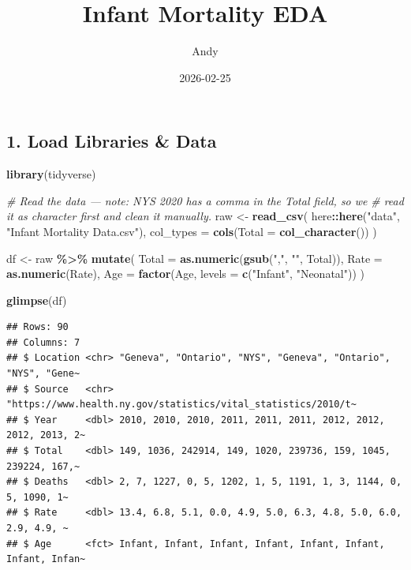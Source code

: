 \documentclass[
]{article}
\title{Infant Mortality EDA}
\author{Andy}
\date{2026-02-25}
\newenvironment{Shaded}{\begin{snugshade}}{\end{snugshade}}
\newcommand{\AttributeTok}[1]{\textcolor[rgb]{0.13,0.29,0.53}{#1}}
\newcommand{\CommentTok}[1]{\textcolor[rgb]{0.56,0.35,0.01}{\textit{#1}}}
\newcommand{\FunctionTok}[1]{\textcolor[rgb]{0.13,0.29,0.53}{\textbf{#1}}}
\newcommand{\NormalTok}[1]{#1}
\newcommand{\OtherTok}[1]{\textcolor[rgb]{0.56,0.35,0.01}{#1}}
\newcommand{\SpecialCharTok}[1]{\textcolor[rgb]{0.81,0.36,0.00}{\textbf{#1}}}
\newcommand{\StringTok}[1]{\textcolor[rgb]{0.31,0.60,0.02}{#1}}
\begin{document}
\maketitle

{
\setcounter{tocdepth}{2}
\tableofcontents
}
\subsection{1. Load Libraries \& Data}\label{load-libraries-data}

\begin{Shaded}
\begin{Highlighting}[]
\FunctionTok{library}\NormalTok{(tidyverse)}

\CommentTok{\# Read the data — note: NYS 2020 has a comma in the Total field, so we}
\CommentTok{\# read it as character first and clean it manually.}
\NormalTok{raw }\OtherTok{\textless{}{-}} \FunctionTok{read\_csv}\NormalTok{(}
\NormalTok{  here}\SpecialCharTok{::}\FunctionTok{here}\NormalTok{(}\StringTok{"data"}\NormalTok{, }\StringTok{"Infant Mortality Data.csv"}\NormalTok{),}
  \AttributeTok{col\_types =} \FunctionTok{cols}\NormalTok{(}\AttributeTok{Total =} \FunctionTok{col\_character}\NormalTok{())}
\NormalTok{)}

\NormalTok{df }\OtherTok{\textless{}{-}}\NormalTok{ raw }\SpecialCharTok{\%\textgreater{}\%}
  \FunctionTok{mutate}\NormalTok{(}
    \AttributeTok{Total =} \FunctionTok{as.numeric}\NormalTok{(}\FunctionTok{gsub}\NormalTok{(}\StringTok{","}\NormalTok{, }\StringTok{""}\NormalTok{, Total)),}
    \AttributeTok{Rate  =} \FunctionTok{as.numeric}\NormalTok{(Rate),}
    \AttributeTok{Age   =} \FunctionTok{factor}\NormalTok{(Age, }\AttributeTok{levels =} \FunctionTok{c}\NormalTok{(}\StringTok{"Infant"}\NormalTok{, }\StringTok{"Neonatal"}\NormalTok{))}
\NormalTok{  )}

\FunctionTok{glimpse}\NormalTok{(df)}
\end{Highlighting}
\end{Shaded}

\begin{verbatim}
## Rows: 90
## Columns: 7
## $ Location <chr> "Geneva", "Ontario", "NYS", "Geneva", "Ontario", "NYS", "Gene~
## $ Source   <chr> "https://www.health.ny.gov/statistics/vital_statistics/2010/t~
## $ Year     <dbl> 2010, 2010, 2010, 2011, 2011, 2011, 2012, 2012, 2012, 2013, 2~
## $ Total    <dbl> 149, 1036, 242914, 149, 1020, 239736, 159, 1045, 239224, 167,~
## $ Deaths   <dbl> 2, 7, 1227, 0, 5, 1202, 1, 5, 1191, 1, 3, 1144, 0, 5, 1090, 1~
## $ Rate     <dbl> 13.4, 6.8, 5.1, 0.0, 4.9, 5.0, 6.3, 4.8, 5.0, 6.0, 2.9, 4.9, ~
## $ Age      <fct> Infant, Infant, Infant, Infant, Infant, Infant, Infant, Infan~
\end{verbatim}
\end{document}
